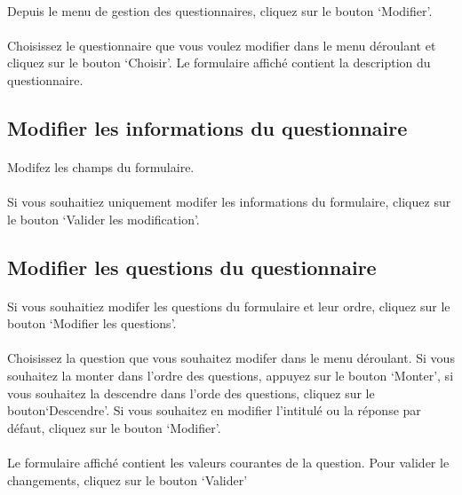 \documentclass[french,12pt,a4paper,openany]{book}
\begin{document}
			\paragraph{}{Depuis le menu de gestion des questionnaires, cliquez sur le bouton `Modifier'.}
			\paragraph{}{Choisissez le questionnaire que vous voulez modifier dans le menu déroulant et cliquez sur le bouton `Choisir'. Le formulaire affiché contient la description du questionnaire.}
			\subsection{Modifier les informations du questionnaire}
				\paragraph{}{Modifez les champs du formulaire.}
				\paragraph{}{Si vous souhaitiez uniquement modifer les informations du formulaire, cliquez sur le bouton `Valider les modification'.}
			\subsection{Modifier les questions du questionnaire}
				\paragraph{}{Si vous souhaitiez modifer les questions du formulaire et leur ordre, cliquez sur le bouton `Modifier les questions'.}
				\paragraph{}{Choisissez la question que vous souhaitez modifer dans le menu déroulant. Si vous souhaitez la monter dans l'ordre des questions, appuyez sur le bouton `Monter', si vous souhaitez la descendre dans l'orde des questions, cliquez sur le bouton`Descendre'. Si vous souhaitez en modifier l'intitulé ou la réponse par défaut, cliquez sur le bouton `Modifier'.}
				\paragraph{}{Le formulaire affiché contient les valeurs courantes de la question. Pour valider le changements, cliquez sur le bouton `Valider'}
\end{document}
